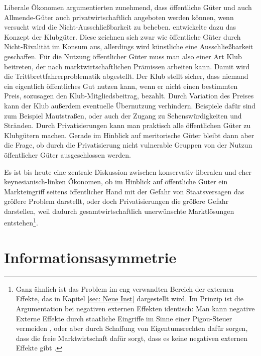 Liberale Ökonomen argumentierten zunehmend, dass öffentliche Güter und auch Allmende-Güter auch privatwirtschaftlich angeboten werden können, wenn versucht wird die Nicht-Ausschließbarkeit zu beheben. \textcite{Buchanan1965} entwickelte dazu das Konzept der Klubgüter. Diese zeichnen sich zwar wie öffentliche Güter durch Nicht-Rivalität im Konsum aus, allerdings wird künstliche eine Ausschließbarkeit geschaffen. Für die Nutzung öffentlicher Güter muss man also einer Art Klub beitreten, der nach marktwirtschaftlichen Prämissen arbeiten kann. Damit wird die Trittbrettfahrerproblematik abgestellt. Der Klub stellt sicher, dass niemand ein eigentlich öffentliches Gut nutzen kann, wenn er nicht einen bestimmten Preis, sozusagen den Klub-Mitgliedsbeitrag, bezahlt. Durch Variation des Preises kann der Klub außerdem eventuelle Übernutzung verhindern. Beispiele dafür sind zum Beispiel Mautstraßen, oder auch der Zugang zu Sehenswürdigkeiten und Stränden. Durch Privatisierungen kann man praktisch alle öffentlichen Güter zu Klubgütern machen. Gerade im Hinblick auf meritorische Güter bleibt dann aber die Frage, ob durch die Privatisierung nicht vulnerable Gruppen von der Nutzun öffentlicher Güter ausgeschlossen werden. 

Es ist bis heute eine zentrale Diskussion zwischen konservativ-liberalen und eher keynesianisch-linken Ökonomen, ob im Hinblick auf öffentliche Güter ein Markteingriff seitens öffentlicher Hand mit der Gefahr von Staatsversagen das größere Problem darstellt, oder doch Privatisierungen die größere Gefahr darstellen, weil dadurch gesamtwirtschaftlich unerwünschte Marktlösungen entstehen\footnote{Ganz ähnlich ist das Problem im eng verwandten Bereich der externen Effekte, das in Kapitel \ref{sec: Neue Inst} dargestellt wird. Im Prinzip ist die Argumentation bei negativen externen Effekten identisch: Man kann negative Externe Effekte durch staatliche Eingriffe im Sinne einer Pigou-Steuer vermeiden \parencite{Pigou1920}, oder aber durch Schaffung von Eigentumsrechten dafür sorgen, dass die freie Marktwirtschaft dafür sorgt, dass es keine negativen externen Effekte gibt \parencite{Coase1960}.}.


\section{Informationsasymmetrie}
\label{Info}


